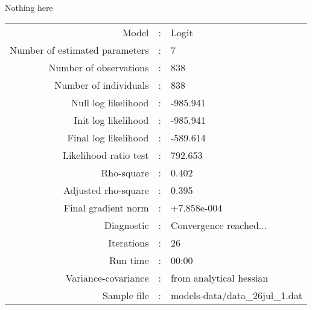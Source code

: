 Nothing here\\


\begin{flushleft}
\begin{tabular}{rcl}
\hline
Model &:& Logit\\
Number of estimated parameters&:&7\\
Number of  observations &:& 838\\
Number of individuals&:&838\\
Null log likelihood&:&-985.941\\
Init log likelihood&:&-985.941\\
Final log likelihood&:&-589.614\\
Likelihood ratio test &:&792.653\\
Rho-square&:&0.402\\
Adjusted rho-square&:&0.395\\
Final gradient norm&:&+7.858e-004\\
Diagnostic&:&Convergence reached...\\
Iterations&:&26\\
Run time&:&00:00\\
Variance-covariance&:&from analytical hessian
\\
Sample file&:&models-data/data_26jul_1.dat\\
\end{tabular}
\end{flushleft}
